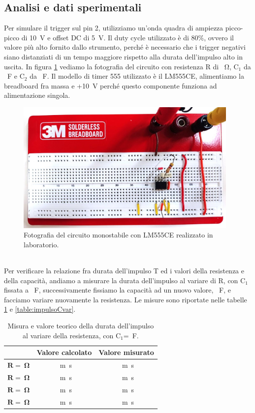 \documentclass{report}
\begin{document}
\subsection{Analisi e dati sperimentali}
Per simulare il trigger sul pin 2, utilizziamo un'onda quadra di ampiezza picco-picco di \SI{10}{\volt} e offset DC di \SI{5}{\volt}. Il duty cycle utilizzato è di 80\%, ovvero il valore più alto fornito dallo strumento, perché è necessario che i trigger negativi siano distanziati di un tempo maggiore rispetto alla durata dell'impulso alto in uscita. In figura \ref{figura:circuito2} vediamo la fotografia del circuito con resistenza R di \SI{}{\ohm}, $\mathrm{C_1}$ da  \SI{}{\farad} e $\mathrm{C_2}$ da  \SI{}{\farad}. Il modello di timer 555 utilizzato è il LM555CE, alimentiamo la breadboard fra massa e +\SI{10}{\volt} perché questo componente funziona ad alimentazione singola.
\begin{figure}[h!]
	\centering
	\includegraphics[height=6.5cm]{immagini/circuito2}
	\caption{Fotografia del circuito monostabile con LM555CE realizzato in laboratorio.}
	\label{figura:circuito2}
\end{figure}
\\Per verificare la relazione fra durata dell'impulso T ed i valori della resistenza e della capacità, andiamo a misurare la durata dell'impulso al variare di R, con $\mathrm{C_1}$ fissata a \SI{}{\farad}, successivamente fissiamo la capacità ad un nuovo valore, \SI{}{\farad}, e facciamo variare nuovamente la resistenza. Le misure sono riportate nelle tabelle \ref{table:impulsoRvar} e \ref{table:impulsoCvar}.
\begin{table}[h!]
	\centering
	\begin{tabular}{|c|c|c|}
		\cline{2-3} 
		\multicolumn{1}{c|}{} & \textbf{Valore calcolato} & \textbf{Valore misurato}\\ 
		\hline
		$\mathbf{R = \SI{}{\ohm}}$ & \SI{}{m\second} & \SI{}{m\second} \\ 
		\hline
		$\mathbf{R = \SI{}{\ohm}}$ & \SI{}{m\second} & \SI{}{m\second} \\ 
		\hline
		$\mathbf{R = \SI{}{\ohm}}$ & \SI{}{m\second} & \SI{}{m\second} \\ 
		\hline
		$\mathbf{R = \SI{}{\ohm}}$ & \SI{}{m\second} & \SI{}{m\second} \\ 
		\hline
	\end{tabular}
	\caption{Misura e valore teorico della durata dell'impulso al variare della resistenza, con $\mathrm{C_1}$=\SI{}{\farad}.}
	\label{table:impulsoRvar}
\end{table}
\end{document}
